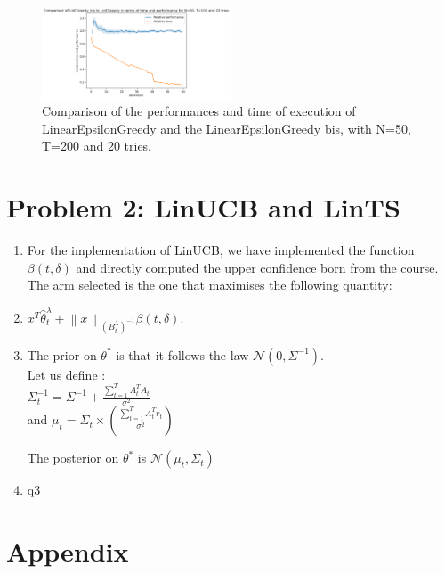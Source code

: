 \begin{enumerate}
\begin{figure}[h]
    \centering
    \includegraphics[width=0.5\textwidth]{images/comparison.png}
    \caption{Comparison of the performances and time of execution of LinearEpsilonGreedy and the LinearEpsilonGreedy bis, with N=50, T=200 and 20 tries.} 
    \label{fig:lin_epsilon_greedy}
\end{figure}





\end{enumerate}


\section{Problem 2: LinUCB and LinTS}


\begin{enumerate}
    \item For the implementation of LinUCB, we have implemented the function $\beta(t,\delta)$ and directly computed the upper confidence born from the course. The arm selected is the one that maximises the following quantity: \\
    \item $x^T\hat{\theta }^\lambda _t + \left\lVert x\right\rVert _{(B_t^\lambda)^{-1} } \beta(t, \delta) $. 
    \item The prior on $\theta^*$ is that it follows the law $\mathcal{N}(0, \Sigma^{-1})$. \\
    
Let us define : \\
$\Sigma_t ^{-1} = \Sigma^{-1} + \frac{\sum_{t=1}^{T} A_t^T A_t}{\sigma^2}$ \\

and $\mu_t = \Sigma_t \times (\frac{\sum_{t=1}^{T} A_t^T r_t}{\sigma^2})$


The posterior on  $\theta^*$ is  $\mathcal{N}(\mu_t, \Sigma_t)$
    \item q3
\end{enumerate}

\section{Appendix}

